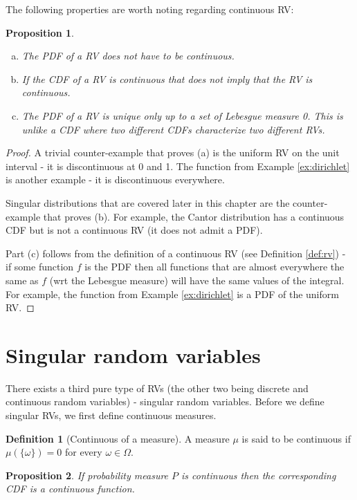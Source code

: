 \documentclass{book}
\theoremstyle{plain}%
\newtheorem{proposition}{Proposition}[section]
\theoremstyle{definition}
\newtheorem{definition}{Definition}[section]
\begin{document}
The following properties are worth noting regarding continuous RV:

\begin{proposition}
$ $
\begin{enumerate}[(a)]
\item The PDF of a RV does not have to be continuous.
\item If the CDF of a RV is continuous that does not imply that the RV is continuous.
\item The PDF of a RV is unique only up to a set of Lebesgue measure 0. This is unlike a CDF where two different CDFs characterize two different RVs.
\end{enumerate}
\end{proposition}

\begin{proof}
A trivial counter-example that proves (a) is the uniform RV on the unit interval - it is discontinuous at 0 and 1. The function from Example \ref{ex:dirichlet} is another example - it is discontinuous everywhere.

Singular distributions that are covered later in this chapter are the counter-example that proves (b). For example, the Cantor distribution has a continuous CDF but is not a continuous RV (it does not admit a PDF).

Part (c) follows from the definition of a continuous RV (see Definition \ref{def:rv}) - if some function $f$ is the PDF then all functions that are almost everywhere the same as $f$ (wrt the Lebesgue measure) will have the same values of the integral. For example, the function from Example \ref{ex:dirichlet} is a PDF of the uniform RV.
\end{proof}

\section{Singular random variables}

There exists a third pure type of RVs (the other two being discrete and continuous random variables) - singular random variables. Before we define singular RVs, we first define continuous measures.

\begin{definition}[Continuous of a measure]
A measure $\mu$ is said to be continuous if $\mu(\{\omega\}) = 0$ for every $\omega \in \Omega$.
\end{definition}

\begin{proposition}
If probability measure $P$ is continuous then the corresponding CDF is a continuous function.
\end{proposition}
\end{document}
